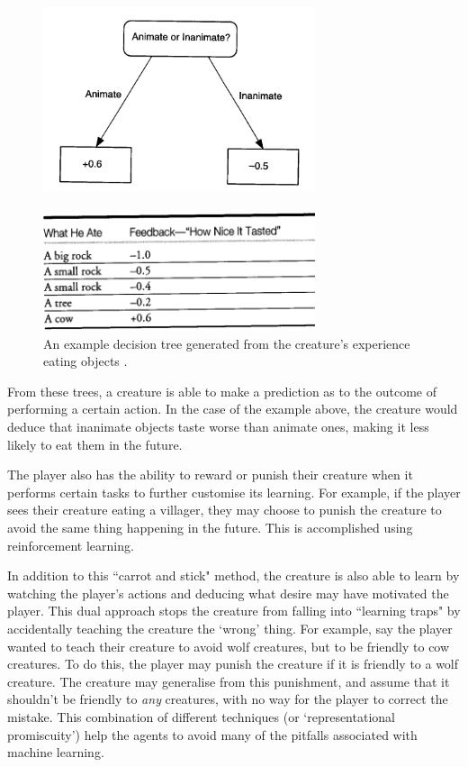 \documentclass[a4paper,oneside]{report}
\begin{document}
\begin{figure}[h!]
	\centering
		\includegraphics[width=80mm]{sources/images/TastyTree}\paragraph{}
    	\includegraphics[width=80mm]{sources/images/TastyTable}
    	\caption{An example decision tree generated from the creature's experience eating objects \cite{:hc}.}
    	\label{fig:TastyTree}
\end{figure}

From these trees, a creature is able to make a prediction as to the outcome of performing a certain action. In the case of the example above, the creature would deduce that inanimate objects taste worse than animate ones, making it less likely to eat them in the future. 

The player also has the ability to reward or punish their creature when it performs certain tasks to further customise its learning. For example, if the player sees their creature eating a villager, they may choose to punish the creature to avoid the same thing happening in the future. This is accomplished using reinforcement learning. 

In addition to this ``carrot and stick" method, the creature is also able to learn by watching the player's actions and deducing what desire may have motivated the player. This dual approach stops the creature from falling into ``learning traps" by accidentally teaching the creature the `wrong' thing. For example, say the player wanted to teach their creature to avoid wolf creatures, but to be friendly to cow creatures. To do this, the player may punish the creature if it is friendly to a wolf creature. The creature may generalise from this punishment, and assume that it shouldn't be friendly to \emph{any} creatures, with no way for the player to correct the mistake. This combination of different techniques (or `representational promiscuity') help the agents to avoid many of the pitfalls associated with machine learning.
\end{document}
